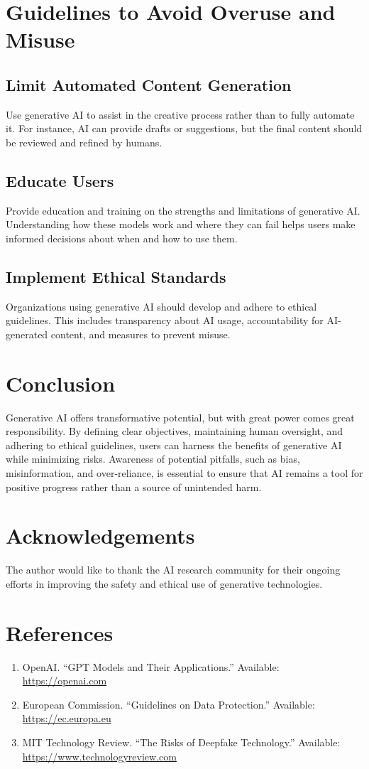 \documentclass{article}
\begin{document}
\section{Guidelines to Avoid Overuse and Misuse}

\subsection{Limit Automated Content Generation}
Use generative AI to assist in the creative process rather than to fully automate it. For instance, AI can provide drafts or suggestions, but the final content should be reviewed and refined by humans.

\subsection{Educate Users}
Provide education and training on the strengths and limitations of generative AI. Understanding how these models work and where they can fail helps users make informed decisions about when and how to use them.

\subsection{Implement Ethical Standards}
Organizations using generative AI should develop and adhere to ethical guidelines. This includes transparency about AI usage, accountability for AI-generated content, and measures to prevent misuse.

\section{Conclusion}
Generative AI offers transformative potential, but with great power comes great responsibility. By defining clear objectives, maintaining human oversight, and adhering to ethical guidelines, users can harness the benefits of generative AI while minimizing risks. Awareness of potential pitfalls, such as bias, misinformation, and over-reliance, is essential to ensure that AI remains a tool for positive progress rather than a source of unintended harm.

\section*{Acknowledgements}
The author would like to thank the AI research community for their ongoing efforts in improving the safety and ethical use of generative technologies.

\section*{References}
\begin{enumerate}
    \item OpenAI. ``GPT Models and Their Applications.'' Available: \url{https://openai.com}
    \item European Commission. ``Guidelines on Data Protection.'' Available: \url{https://ec.europa.eu}
    \item MIT Technology Review. ``The Risks of Deepfake Technology.'' Available: \url{https://www.technologyreview.com}
\end{enumerate}
\end{document}
